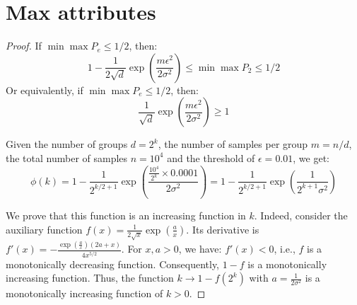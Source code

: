 \section{Max attributes}\label{sec:max_attributes}


\begin{proof}
     If $\min \max P_e \leq 1/2$, then:
     \begin{equation}
         1 - \frac{1}{2\sqrt{d}}         
            \exp
        \left(\frac{m \epsilon^2}{2\sigma^2}
        \right)
        \leq \min \max P_2 
        \leq 1/2
     \end{equation}
     Or equivalently, if $\min \max P_e \leq 1/2$, then:
    \begin{equation}
        \frac{1}{\sqrt{d}}         
                \exp
            \left(\frac{m \epsilon^2}{2\sigma^2}
            \right)
            \geq 1
    \end{equation}
    
         Given the number of groups $d = 2^k$, the number of samples per group $m = n/d$, the total number of samples $n = 10^{4} $ and the threshold of $\epsilon = 0.01$, we get:
     \begin{equation}
         \phi(k) 
         = 1 - 
         \frac{1}{2^{k/2+1}}         
            \exp
        \left(
        \frac{ \frac{10^{4}} {2^k}\times 0.0001}{2\sigma^2}
        \right)
        = 1 - 
           \frac{1}{2^{k/2+1}}         
            \exp
        \left(
        \frac{1}{2^{k+1}\sigma^2}
        \right)
     \end{equation}

     We prove that this function is an increasing function in $k$. Indeed, consider the auxiliary function $f(x) = \frac{1}{2\sqrt{x}}\exp(\frac{a}{x})$. Its derivative is $f'(x) = -\frac{\exp(\frac{a}{x})(2a+x)}{4x^{5/2}}$. For $x, a > 0$, we have: $f'(x)< 0$, i.e., $f$ is a monotonically decreasing function. Consequently, $1 - f$ is a monotonically increasing function. Thus, the function $k \rightarrow 1 - f(2^k)$ with $a = \frac{1}{2\sigma^2}$ is a monotonically increasing function of $k > 0$.
\end{proof}